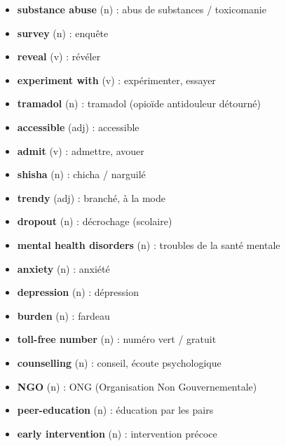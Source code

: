 \documentclass[11pt]{article}
\begin{document}
\begin{aretenir}
\begin{itemize}
    \item \textbf{substance abuse} (n) : abus de substances / toxicomanie
    \item \textbf{survey} (n) : enquête
    \item \textbf{reveal} (v) : révéler
    \item \textbf{experiment with} (v) : expérimenter, essayer
    \item \textbf{tramadol} (n) : tramadol (opioïde antidouleur détourné)
    \item \textbf{accessible} (adj) : accessible
    \item \textbf{admit} (v) : admettre, avouer
    \item \textbf{shisha} (n) : chicha / narguilé
    \item \textbf{trendy} (adj) : branché, à la mode
    \item \textbf{dropout} (n) : décrochage (scolaire)
    \item \textbf{mental health disorders} (n) : troubles de la santé mentale
    \item \textbf{anxiety} (n) : anxiété
    \item \textbf{depression} (n) : dépression
    \item \textbf{burden} (n) : fardeau
    \item \textbf{toll-free number} (n) : numéro vert / gratuit
    \item \textbf{counselling} (n) : conseil, écoute psychologique
    \item \textbf{NGO} (n) : ONG (Organisation Non Gouvernementale)
    \item \textbf{peer-education} (n) : éducation par les pairs
    \item \textbf{early intervention} (n) : intervention précoce
\end{itemize}
\end{aretenir}
\end{document}
